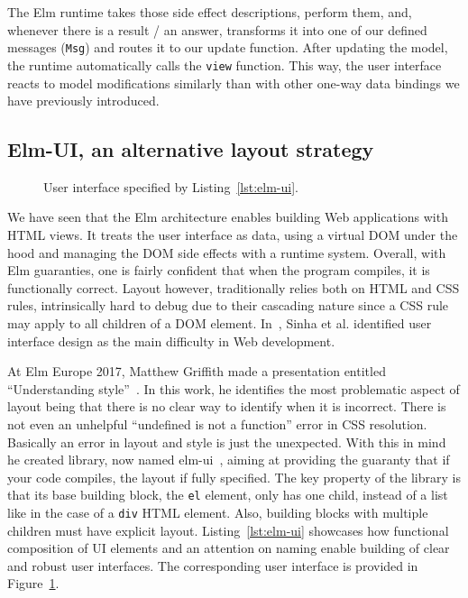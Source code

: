The Elm runtime takes those side effect descriptions,
perform them, and, whenever there is a result / an answer,
transforms it into one of our defined messages (\verb|Msg|)
and routes it to our update function.
After updating the model, the runtime automatically calls the \verb|view| function.
This way, the user interface reacts to model modifications
similarly than with other one-way data bindings we have previously introduced.


\subsection{Elm-UI, an alternative layout strategy}%
\label{sub:elm_ui_an_alternative_layout_strategy}

\begin{figure}[ht]
	\centering
	\setlength{\fboxsep}{0pt}
	\caption{User interface specified by Listing~\ref{lst:elm-ui}.}%
	\label{fig:elm-ui}
\end{figure}

We have seen that the Elm architecture enables building Web applications with HTML views.
It treats the user interface as data, using a virtual DOM under the hood
and managing the DOM side effects with a runtime system.
Overall, with Elm guaranties, one is fairly confident that when
the program compiles, it is functionally correct.
Layout however, traditionally relies both on HTML and CSS rules,
intrinsically hard to debug due to their cascading nature
since a CSS rule may apply to all children of a DOM element.
In~\cite{sinha2015simplifying}, Sinha et al. identified user interface design
as the main difficulty in Web development.

At Elm Europe 2017, Matthew Griffith made a presentation
entitled ``Understanding style''~\cite{griffithstyle}.
In this work, he identifies the most problematic aspect of layout being
that there is no clear way to identify when it is incorrect.
There is not even an unhelpful ``undefined is not a function'' error in CSS resolution.
Basically an error in layout and style is just the unexpected.
With this in mind he created library, now named elm-ui~\cite{griffithelmui},
aiming at providing the guaranty that if your code compiles,
the layout if fully specified.
The key property of the library is that its base building block,
the \verb|el| element, only has one child,
instead of a list like in the case of a \verb|div| HTML element.
Also, building blocks with multiple children must have explicit layout.
Listing~\ref{lst:elm-ui} showcases how functional composition of UI elements
and an attention on naming enable building of clear and robust user interfaces.
The corresponding user interface is provided in Figure~\ref{fig:elm-ui}.

